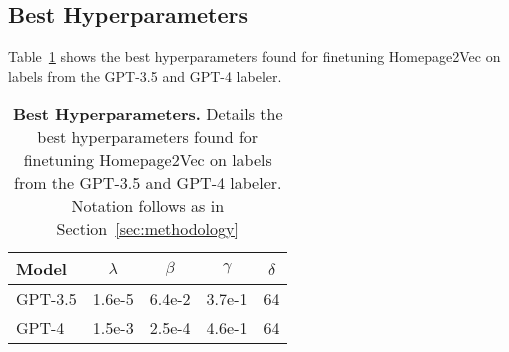\subsection{Best Hyperparameters}\label{app:hyperparameters}

Table~\ref{tab:best-hyperparameters} shows the best hyperparameters found for finetuning Homepage2Vec on labels from the GPT-3.5 and GPT-4 labeler.

\begin{table}[h]
    \centering
    \caption{\textbf{Best Hyperparameters.} Details the 
    best hyperparameters found for finetuning Homepage2Vec on labels from the GPT-3.5 and GPT-4 labeler. Notation follows as in Section~\ref{sec:methodology}}
    \begin{tabular}{lcccc}
        \toprule
        \textbf{Model} & $\lambda$ & $\beta$ & $\gamma$ & $\delta$ \\
        \midrule
        GPT-3.5 & 1.6e-5 & 6.4e-2 & 3.7e-1 & 64 \\
        GPT-4 & 1.5e-3 & 2.5e-4 & 4.6e-1 & 64 \\
        \bottomrule

    \end{tabular}
    \label{tab:best-hyperparameters}
\end{table}